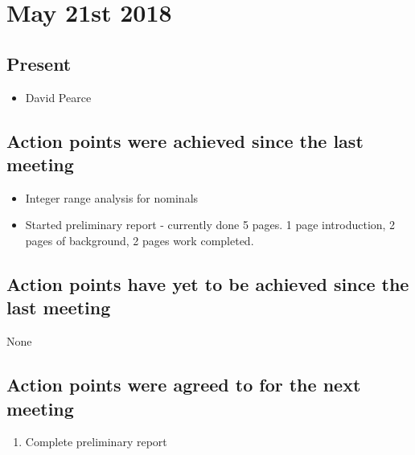 \documentclass[]{article}
\begin{document}
\section{May 21st 2018}
\subsection{Present}
\begin{itemize}
	\item David Pearce
\end{itemize}

\subsection{Action points were achieved since the last meeting}
\begin{itemize}
	\item Integer range analysis for nominals
	\item Started preliminary report - currently done 5 pages. 1 page introduction, 2 pages of background, 2 pages work completed.
\end{itemize}
\subsection{Action points have yet to be achieved since the last meeting}
None
\subsection{Action points were agreed to for the next meeting}
\begin{enumerate}
	\item Complete preliminary report
\end{enumerate}
\end{document}
